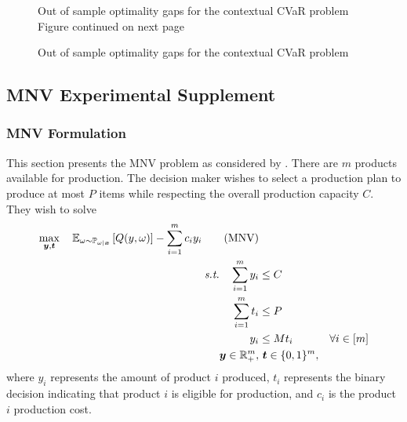     \begin{figure}[H]
        \FIGURE
        {}
        {Out of sample optimality gaps for the contextual CVaR problem \label{fig:cvar_gaps1}} {Figure continued on next page}
    \end{figure}

    \begin{figure}[H]
            \FIGURE
            {}
            {Out of sample optimality gaps for the contextual CVaR problem \label{fig:cvar_gaps2}} {}
        \end{figure}



\subsection{MNV Experimental Supplement}\label{appendix:MNV_data_formulation}

\subsubsection{MNV Formulation}\label{appendix:MNV_formulation}
This section presents the MNV problem as considered by \citet{narum2024problem}. There are $m$ products available for production. The decision maker wishes to select a production plan to produce at most $P$ items while respecting the overall production capacity $C$. They wish to solve
        \begin{align}\label{eq:mnv_firststage} 
        \max_{\boldsymbol{y}, \boldsymbol{t}} \quad \mathbb{E}_{\omega \sim \mathbb{P}_{\omega|\boldsymbol{x}}}\left[ Q(y, \omega) \right] - \sum_{i=1}^m c_i y_i  \tag{MNV} \\
        \textit{s.t.} \quad \sum_{i=1}^m y_i &\leq C  \notag \\
        \quad \sum_{i=1}^m t_i &\leq P  \notag \\
        \quad y_i &\leq M t_i & \forall i \in [m]  \notag \\
        \quad \boldsymbol{y} \in \mathbb{R}^m_+, & \ \boldsymbol{t} \in \{0, 1\}^m, \notag
        \end{align}
    where \(y_i\) represents the amount of product $i$ produced, \(t_i\) represents the binary decision indicating that product $i$ is eligible for production, and \(c_i\) is the product $i$ production cost. 


